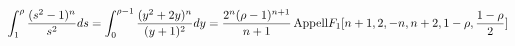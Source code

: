 \begin{equation}
\int ^{\rho}_{1}\frac{(s^{2}-1)^{n}}{s^{2}}ds= \int
^{\rho-1}_{0}\frac{(y^{2}+2y)^{n}}{(y+1)^{2}}dy=
\frac{2^{n}(\rho-1)^{n+1}}{n+1}\,{\rm{Appell}}F_{1}[n+1,2,-n,n+2,1-\rho,\frac{1-\rho}{2}]
\end{equation}

